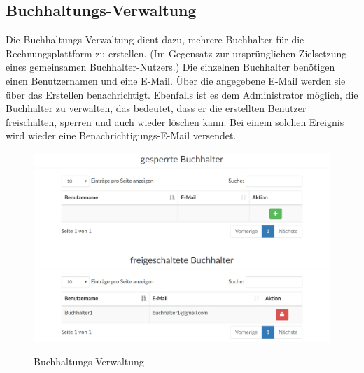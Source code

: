 \subsection{Buchhaltungs-Verwaltung}
Die Buchhaltungs-Verwaltung dient dazu, mehrere Buchhalter für die Rechnungsplattform zu erstellen. (Im Gegensatz zur ursprünglichen Zielsetzung eines gemeinsamen Buchhalter-Nutzers.) Die einzelnen Buchhalter benötigen einen Benutzernamen und eine E-Mail. Über die angegebene E-Mail werden sie über das Erstellen benachrichtigt. Ebenfalls ist es dem Administrator möglich, die Buchhalter zu verwalten, das bedeutet, dass er die erstellten Benutzer freischalten, sperren und auch wieder löschen kann. Bei einem solchen Ereignis wird wieder eine Benachrichtigungs-E-Mail versendet.
\begin{figure}[!h]
    \centering
    \includegraphics[width=17cm]{figures/buchhalter.png}
    \label{fig:buchhaltungsverwaltung}
    \caption{Buchhaltungs-Verwaltung}
\end{figure}
\newpage
